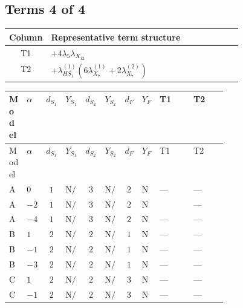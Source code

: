 \documentclass[8pt]{article}
\begin{document}
\begin{landscape}
\subsection*{Terms 4 of 4}
\begin{center}
\begin{tabular}{@{}c >{\raggedright\arraybackslash}p{0.82\linewidth}@{}}
\toprule
Column & Representative term structure \\
\midrule
T1 & \(\displaystyle +4 {\lambda_5} {\lambda_{X_{12}}}\) \\
\midrule
T2 & \(\displaystyle +{\lambda_{HS_1}^{(1)}} (6 {\lambda_{X_{7}}^{(1)}}+2 {\lambda_{X_{7}}^{(2)}})\) \\
\midrule
\bottomrule
\end{tabular}
\end{center}
\smallskip
\tiny
\begin{longtable}{@{}llcccccc >{\raggedright\arraybackslash}p{0.21\linewidth} >{\raggedright\arraybackslash}p{0.21\linewidth}@{}}
\toprule
Model & $\alpha$ & $d_{S_1}$ & $Y_{S_1}$ & $d_{S_2}$ & $Y_{S_2}$ & $d_F$ & $Y_F$ & T1 & T2 \\
\midrule
\endfirsthead
\toprule
Model & $\alpha$ & $d_{S_1}$ & $Y_{S_1}$ & $d_{S_2}$ & $Y_{S_2}$ & $d_F$ & $Y_F$ & T1 & T2 \\
\midrule
\endhead
A & $0$ & $1$ & $\text{N/A}$ & $3$ & $\text{N/A}$ & $2$ & $\text{N/A}$ & --- & --- \\
\midrule
A & $-2$ & $1$ & $\text{N/A}$ & $3$ & $\text{N/A}$ & $2$ & $\text{N/A}$ & \scriptsize\adjustbox{max width=\linewidth}{$\begin{gathered} +4 {\lambda_5} {\lambda_{X_{12}}}\end{gathered}$} & --- \\
\midrule
A & $-4$ & $1$ & $\text{N/A}$ & $3$ & $\text{N/A}$ & $2$ & $\text{N/A}$ & --- & --- \\
\midrule
B & $1$ & $2$ & $\text{N/A}$ & $2$ & $\text{N/A}$ & $1$ & $\text{N/A}$ & --- & --- \\
\midrule
B & $-1$ & $2$ & $\text{N/A}$ & $2$ & $\text{N/A}$ & $1$ & $\text{N/A}$ & --- & --- \\
\midrule
B & $-3$ & $2$ & $\text{N/A}$ & $2$ & $\text{N/A}$ & $1$ & $\text{N/A}$ & --- & --- \\
\midrule
C & $1$ & $2$ & $\text{N/A}$ & $2$ & $\text{N/A}$ & $3$ & $\text{N/A}$ & --- & --- \\
\midrule
C & $-1$ & $2$ & $\text{N/A}$ & $2$ & $\text{N/A}$ & $3$ & $\text{N/A}$ & --- & --- \\

\end{longtable}
\end{landscape}
\end{document}
